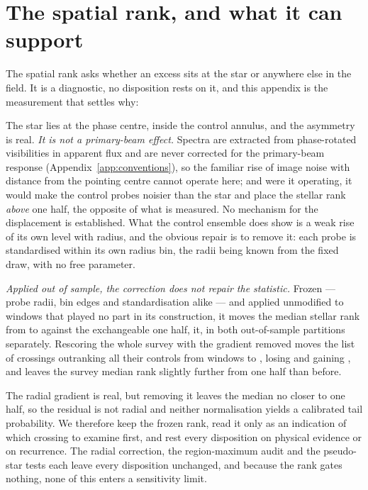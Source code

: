 \section{The spatial rank, and what it can support}
\label{app:radius}

The spatial rank asks whether an excess sits at the star or anywhere else in
the field. It is a diagnostic, no disposition rests on it, and this appendix
is the measurement that settles why: \rankstatus{}

The star lies at the phase centre, inside the control annulus, and the
asymmetry is real. \emph{It is not a primary-beam effect.} Spectra are
extracted from phase-rotated visibilities in apparent flux and are never
corrected for the primary-beam response (Appendix~\ref{app:conventions}), so
the familiar rise of image noise with distance from the pointing centre
cannot operate here; and were it operating, it would make the control probes
noisier than the star and place the stellar rank \emph{above} one half, the
opposite of what is measured. No mechanism for the displacement is
established. What the control ensemble does show is
a weak rise of its own level with radius, and the obvious repair is to remove
it: each probe is standardised within its own radius bin, the radii being
known from the fixed draw, with no free parameter.

\emph{Applied out of sample, the correction does not repair the statistic.}
Frozen --- probe radii, bin edges and standardisation alike --- and applied
unmodified to \RadValStarN{} windows that played no part in its construction,
it moves the median stellar rank from \RadValStarRawMed{} to
\RadValStarCorMed{} against the exchangeable one half, \RadValStarToward{}
it, in both out-of-sample partitions separately. Rescoring the whole survey
with the gradient removed moves the list of crossings outranking all their
controls from \LocStageGlobal{} windows to \LocStageLocal, losing
\LocStageLost{} and gaining \LocStageGained, and leaves the survey median
rank slightly further from one half than before.

The radial gradient is real, but removing it leaves the median no closer to
one half, so the residual is not radial and neither normalisation yields a
calibrated tail probability. We therefore keep the frozen rank, read
it only as an indication of which crossing to examine first, and rest every
disposition on physical evidence or on recurrence. The radial correction, the
region-maximum audit and the pseudo-star tests each leave every disposition
unchanged, and because the rank gates nothing, none of this enters a
sensitivity limit.

